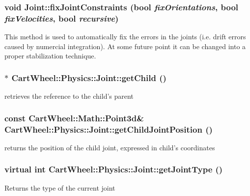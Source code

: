 \hypertarget{classCartWheel_1_1Physics_1_1Joint_a7939e7b1b3fefec4080687acfcc3a1a4}{
\subsubsection[{fixJointConstraints}]{\setlength{\rightskip}{0pt plus 5cm}void Joint::fixJointConstraints (bool {\em fixOrientations}, \/  bool {\em fixVelocities}, \/  bool {\em recursive})}}
\label{classCartWheel_1_1Physics_1_1Joint_a7939e7b1b3fefec4080687acfcc3a1a4}
This method is used to automatically fix the errors in the joints (i.e. drift errors caused by numercial integration). At some future point it can be changed into a proper stabilization technique. \hypertarget{classCartWheel_1_1Physics_1_1Joint_a82537e73fcfdc27403a65f2936bf11a9}{
\subsubsection[{getChild}]{$\ast$ CartWheel::Physics::Joint::getChild ()}}
\label{classCartWheel_1_1Physics_1_1Joint_a82537e73fcfdc27403a65f2936bf11a9}
retrieves the reference to the child's parent \hypertarget{classCartWheel_1_1Physics_1_1Joint_a3ffb2ecc8fe1d297ccc6a7e61482ab11}{
\subsubsection[{getChildJointPosition}]{\setlength{\rightskip}{0pt plus 5cm}const {\bf CartWheel::Math::Point3d}\& CartWheel::Physics::Joint::getChildJointPosition ()}}
\label{classCartWheel_1_1Physics_1_1Joint_a3ffb2ecc8fe1d297ccc6a7e61482ab11}
returns the position of the child joint, expressed in child's coordinates \hypertarget{classCartWheel_1_1Physics_1_1Joint_a6940878e260534a3803b14aa697b88f7}{
\subsubsection[{getJointType}]{\setlength{\rightskip}{0pt plus 5cm}virtual int CartWheel::Physics::Joint::getJointType ()}}
\label{classCartWheel_1_1Physics_1_1Joint_a6940878e260534a3803b14aa697b88f7}
Returns the type of the current joint 

